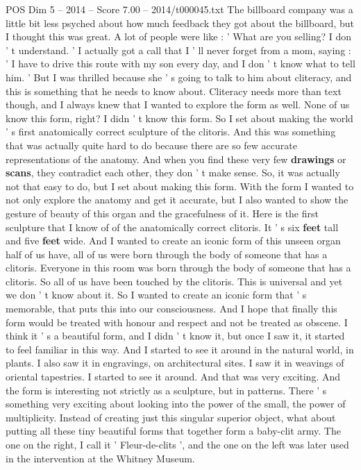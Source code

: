 \begin{textsample}{POS Dim 5 – 2014 – Score 7.00 – 2014/t000045.txt}
The billboard company was a little bit less psyched about how much feedback they got about the billboard, but I thought this was great.
A lot of people were like : ' What are you selling?
I don ' t understand. ' I actually got a call that I ' ll never forget from a mom, saying : ' I have to drive this route with my son every day, and I don ' t know what to tell him. ' But I was thrilled because she ' s going to talk to him about cliteracy, and this is something that he needs to know about.
Cliteracy needs more than text though, and I always knew that I wanted to explore the form as well.
None of us know this form, right?
I didn ' t know this form.
So I set about making the world ' s first anatomically correct sculpture of the clitoris.
And this was something that was actually quite hard to do because there are so few accurate representations of the anatomy.
And when you find these very few \textbf{drawings} or \textbf{scans}, they contradict each other, they don ' t make sense.
So, it was actually not that easy to do, but I set about making this form.
With the form I wanted to not only explore the anatomy and get it accurate, but I also wanted to show the gesture of beauty of this organ and the gracefulness of it.
Here is the first sculpture that I know of of the anatomically correct clitoris.
It ' s six \textbf{feet} tall and five \textbf{feet} wide.
And I wanted to create an iconic form of this unseen organ half of us have, all of us were born through the body of someone that has a clitoris.
Everyone in this room was born through the body of someone that has a clitoris.
So all of us have been touched by the clitoris.
This is universal and yet we don ' t know about it.
So I wanted to create an iconic form that ' s memorable, that puts this into our consciousness.
And I hope that finally this form would be treated with honour and respect and not be treated as obscene.
I think it ' s a beautiful form, and I didn ' t know it, but once I saw it, it started to feel familiar in this way.
And I started to see it around in the natural world, in plants.
I also saw it in engravings, on architectural sites.
I saw it in weavings of oriental tapestries.
I started to see it around.
And that was very exciting.
And the form is interesting not strictly as a sculpture, but in patterns.
There ' s something very exciting about looking into the power of the small, the power of multiplicity.
Instead of creating just this singular superior object, what about putting all these tiny beautiful forms that together form a baby-clit army.
The one on the right, I call it ' Fleur-de-clits ', and the one on the left was later used in the intervention at the Whitney Museum.

\end{textsample}
